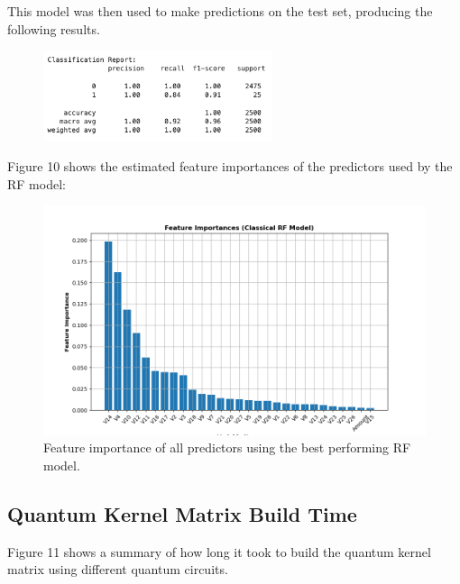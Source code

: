 \documentclass[11pt, oneside]{article}   	%
\begin{document}
\newpage This model was then used to make predictions on the test set, producing the following results.

\begin{figure}[h!]
	\centering
	\includegraphics[width=0.6\textwidth]{figures/rf_results.png}
\end{figure}

Figure 10 shows the estimated feature importances of the predictors used by the RF model: 

\begin{figure}[h!]
    \centering
    \includegraphics[width=1\textwidth]{figures/fig_10.png}
    \captionsetup{font=small} 
    \caption{Feature importance of all predictors using the best performing RF model.}
    \label{fig10}
\end{figure}




\subsection{Quantum Kernel Matrix Build Time}

Figure 11 shows a summary of how long it took to build the quantum kernel matrix using different quantum circuits.
\end{document}
